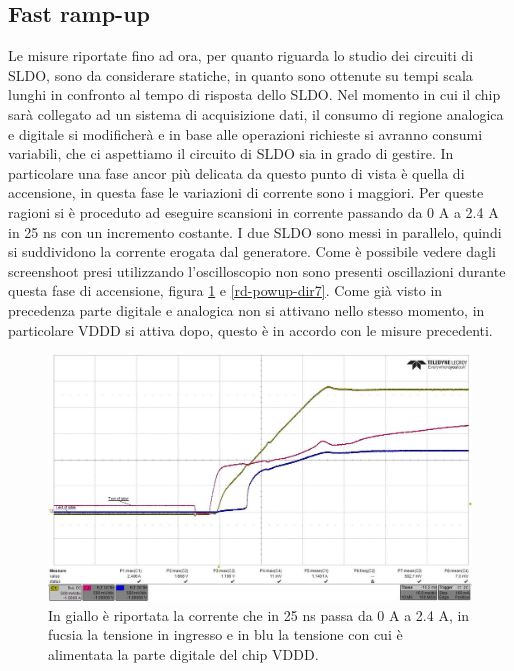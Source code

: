 \subsection{Fast ramp-up}
Le misure riportate fino ad ora, per quanto riguarda lo studio dei circuiti di SLDO, sono da considerare statiche, in quanto sono ottenute su tempi scala lunghi in confronto al tempo di risposta dello SLDO. 
Nel momento in cui il chip sarà collegato ad un sistema di acquisizione dati, il consumo di regione analogica e digitale si modificherà e in base alle operazioni richieste si avranno consumi variabili, che ci aspettiamo il circuito di SLDO sia in grado di gestire. 
In particolare una fase ancor più delicata da questo punto di vista è quella di accensione, in questa fase le variazioni di corrente sono i maggiori. 
Per queste ragioni si è proceduto ad eseguire scansioni in corrente passando da 0 A a 2.4 A in 25 ns con un incremento costante. I due SLDO sono messi in parallelo, quindi si suddividono la corrente erogata dal generatore. Come è possibile vedere dagli screenshoot presi utilizzando l'oscilloscopio non sono presenti oscillazioni durante questa fase di accensione, figura \ref{rd-powup-dir6} e \ref{rd-powup-dir7}. 
Come già visto in precedenza parte digitale e analogica non si attivano nello stesso momento, in particolare VDDD si attiva dopo, questo è in accordo con le misure precedenti.

\begin{figure}
\centering
\includegraphics[scale=.3]{Immagini/rd-powup-dir6}
\caption{In giallo è riportata la corrente che in 25 ns passa da 0 A a 2.4 A, in fucsia la tensione in ingresso e in blu la tensione con cui è alimentata la parte digitale del chip VDDD.}
\label{rd-powup-dir6}
\end{figure}


